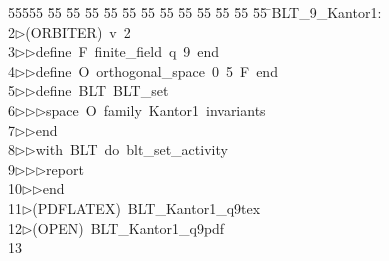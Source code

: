 %
%
\begin{tabbing}
55555 \= 55 \= 55 \= 55 \= 55 \= 55 \= 55 \= 55 \= 55 \= 55 \= 55 \= 55 \= 55 \= \>BLT\_9\_Kantor1:\\[0pt]
2\>$\triangleright$\>(ORBITER)\ v\ 2\ \\[0pt]
3\>$\triangleright$\>$\triangleright$\>define\ F\ finite\_field\ q\ 9\ end\ \\[0pt]
4\>$\triangleright$\>$\triangleright$\>define\ O\ orthogonal\_space\ 0\ 5\ F\ end\ \\[0pt]
5\>$\triangleright$\>$\triangleright$\>define\ BLT\ BLT\_set\ \\[0pt]
6\>$\triangleright$\>$\triangleright$\>$\triangleright$\>space\ O\ family\ Kantor1\ invariants\ \\[0pt]
7\>$\triangleright$\>$\triangleright$\>end\ \\[0pt]
8\>$\triangleright$\>$\triangleright$\>with\ BLT\ do\ blt\_set\_activity\ \\[0pt]
9\>$\triangleright$\>$\triangleright$\>$\triangleright$\>report\ \\[0pt]
10\>$\triangleright$\>$\triangleright$\>end\\[0pt]
11\>$\triangleright$\>(PDFLATEX)\ BLT\_Kantor1\_q9tex\\[0pt]
12\>$\triangleright$\>(OPEN)\ BLT\_Kantor1\_q9pdf\\[0pt]
13\>\end{tabbing}
